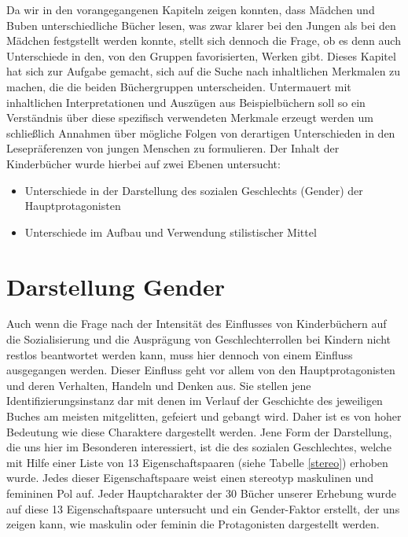 Da wir in den vorangegangenen Kapiteln zeigen konnten, dass Mädchen und
Buben unterschiedliche Bücher lesen, was zwar klarer bei den Jungen als
bei den Mädchen festgstellt werden konnte, stellt sich dennoch die
Frage, ob es denn auch Unterschiede in den, von den Gruppen
favorisierten, Werken gibt. Dieses Kapitel hat sich zur Aufgabe gemacht,
sich auf die Suche nach inhaltlichen Merkmalen zu machen, die die beiden
Büchergruppen unterscheiden. Untermauert mit inhaltlichen
Interpretationen und Auszügen aus Beispielbüchern soll so ein
Verständnis über diese spezifisch verwendeten Merkmale erzeugt werden um
schließlich Annahmen über mögliche Folgen von derartigen Unterschieden
in den Lesepräferenzen von jungen Menschen zu formulieren. Der Inhalt
der Kinderbücher wurde hierbei auf zwei Ebenen untersucht:

\begin{itemize}
\item
  Unterschiede in der Darstellung des sozialen Geschlechts (Gender) der
  Hauptprotagonisten
\item
  Unterschiede im Aufbau und Verwendung stilistischer Mittel
\end{itemize}

\section{Darstellung Gender}

Auch wenn die Frage nach der Intensität des Einflusses von Kinderbüchern
auf die Sozialisierung und die Ausprägung von Geschlechterrollen bei
Kindern nicht restlos beantwortet werden kann, muss hier dennoch von
einem Einfluss ausgegangen werden. Dieser Einfluss geht vor allem von
den Hauptprotagonisten und deren Verhalten, Handeln und Denken aus. Sie
stellen jene Identifizierungsinstanz dar mit denen im Verlauf der
Geschichte des jeweiligen Buches am meisten mitgelitten, gefeiert und
gebangt wird. Daher ist es von hoher Bedeutung wie diese Charaktere
dargestellt werden. Jene Form der Darstellung, die uns hier im
Besonderen interessiert, ist die des sozialen Geschlechtes, welche mit
Hilfe einer Liste von 13 Eigenschaftspaaren (siehe Tabelle \ref{stereo})
erhoben wurde. Jedes dieser Eigenschaftspaare weist einen stereotyp
maskulinen und femininen Pol auf. Jeder Hauptcharakter der 30 Bücher
unserer Erhebung wurde auf diese 13 Eigenschaftspaare untersucht und ein
Gender-Faktor erstellt, der uns zeigen kann, wie maskulin oder feminin
die Protagonisten dargestellt werden.

